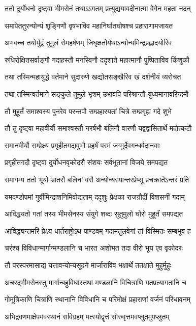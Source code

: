 \twolineshloka
{ततो दुर्योधनो दृष्ट्वा भीमसेनं तथाऽऽगतम्}
{प्रत्युद्ययावदीनात्मा वेगेन महता नदन्}


\twolineshloka
{समापेततुरन्योन्यं शृङ्गिणौ वृषभाविव}
{महानिर्घातघोषश्च प्रहाराणामजायत}


\twolineshloka
{अभवच्च तयोर्युद्वं तुमुलं रोमहर्षणम्}
{जिघृक्षतोर्यथाऽन्योन्यमिन्द्रप्रह्लादयोरिव}


\twolineshloka
{रुधिरोक्षितसर्वाङ्गौ गदाहस्तौ मनस्विनौ}
{ददृशाते महात्मानौ पुष्पिताविव किंशुकौ}


\twolineshloka
{तथा तस्मिन्महायुद्धे वर्तमाने सुदारुणे}
{खद्योतसङ्खैरिव खं दर्शनीयं व्यरोचत}


\twolineshloka
{तथा तस्मिन्वर्तमाने सङ्कुले तुमुले भृशम्}
{उभावपि परिश्रान्तौ युध्यमानावरिन्दमौ}


\twolineshloka
{तौ मुहूर्तं समाश्वस्य पुनरेव परन्तपौ}
{सम्प्रहारयतां चित्रे सम्प्रगृह्य गदे शुभे}


\twolineshloka
{तौ तु दृष्ट्वा महावीर्यौ समाश्वस्तौ नरर्षभौ}
{बलिनौ वारणौ यद्वद्वासितार्थे मदोत्कटौ}


\twolineshloka
{समानवीर्यौ सम्प्रेक्ष्य प्रगृहीतगदावुभौ}
{प्रहर्षं परमं जग्मुर्देवगन्धर्वदानवाः}


\twolineshloka
{प्रगृहीतगदौ दृष्ट्वा दुर्योधनवृकोदरौ}
{संशयः सर्वभूतानां विजये समपद्यत}


\twolineshloka
{समागम्य ततो भूयो भ्रातरौ बलिनां वरौ}
{अन्योन्यस्यान्तरप्रेप्सू प्रचक्रातेऽन्तरं प्रति}


\twolineshloka
{यमदण्डोपमां गुर्वीमिन्द्राशनिमिवोद्यताम्}
{ददृशुः प्रेक्षका राजन्रौद्रीं विशसनीं गदाम्}


\twolineshloka
{आविद्ध्यतो गतां तस्य भीमसेनस्य संयुगे}
{शब्दः सुतुमुलो घोरो मुहूर्तं समपद्यत}


\twolineshloka
{आविद्ध्यन्तमरिं प्रेक्ष्य धार्तराष्ट्रोऽथ पाण्डवम्}
{गदामतुलवेगां तां विस्मितः सम्बभूव ह}


\twolineshloka
{चरंश्च विविधान्मार्गान्मण्डलानि च भारत}
{अशोभत तदा वीरो भूय एव वृकोदरः}


\twolineshloka
{तौ परस्परमासाद्य यत्तावन्योन्यसूदने}
{मार्जाराविव भक्षार्थे ततक्षाते मुहुर्मुहुः}


\twolineshloka
{अचरद्भीमसेनस्तु मार्गान्बहुविधांस्तथा}
{मण्डलानि विचित्राणि गतप्रत्यागतानि च}


\twolineshloka
{गोमूत्रिकाणि चित्राणि स्थानानि विविधानि च}
{परिमोक्षं प्रहाराणां वर्जनं परिधावनम्}


\twolineshloka
{अभिद्रवणमाक्षेपमवस्थानं सविग्रहम्}
{मत्स्योद्वृत्तं सोरुवृत्तमवप्लुतमुपप्लुतम्}


